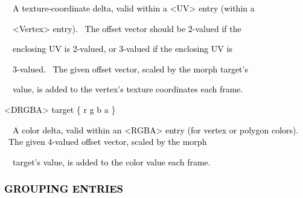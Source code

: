 \documentclass[a4paper]{article}
\newcommand\textstyleOOoComputerKeyWord[1]{\textrm{\textcolor[rgb]{0.0,0.0,0.5019608}{#1}}}
\newcommand\textstyleOOoAssemblerSpecialChar[1]{\textrm{\textcolor[rgb]{0.0,0.5019608,0.0}{#1}}}
\newcommand\textstyleOOoAssemblerIdent[1]{\textrm{\textcolor{black}{#1}}}
\begin{document}
\bigskip

{\color{black}
\textstyleOOoComputerKeyWord{\textcolor{black}{\ \ A texture-coordinate delta, valid within a
{\textless}UV{\textgreater} entry (within a}}}

{\color{black}
\textstyleOOoComputerKeyWord{\textcolor{black}{\ \ {\textless}Vertex{\textgreater} entry). \ The offset vector should be
2-valued if the}}}

{\color{black}
\textstyleOOoComputerKeyWord{\textcolor{black}{\ \ enclosing UV is 2-valued, or 3-valued if the enclosing UV is}}}

{\color{black}
\textstyleOOoComputerKeyWord{\textcolor{black}{\ \ 3-valued. \ The given offset vector, scaled by the morph target's}}}

{\color{black}
\textstyleOOoComputerKeyWord{\textcolor{black}{\ \ value, is added to the vertex's texture coordinates each frame.}}}


\bigskip

{\color{black}
\textstyleOOoAssemblerSpecialChar{{\textless}}\textstyleOOoAssemblerIdent{DRGBA}\textstyleOOoAssemblerSpecialChar{{\textgreater}}\textstyleOOoComputerKeyWord{\textcolor{black}{
}}\textstyleOOoAssemblerIdent{target}\textstyleOOoComputerKeyWord{\textcolor{black}{
}}\textstyleOOoAssemblerSpecialChar{\{}\textstyleOOoComputerKeyWord{\textcolor{black}{
}}\textstyleOOoAssemblerIdent{r}\textstyleOOoComputerKeyWord{\textcolor{black}{
}}\textstyleOOoAssemblerIdent{g}\textstyleOOoComputerKeyWord{\textcolor{black}{
}}\textstyleOOoAssemblerIdent{b}\textstyleOOoComputerKeyWord{\textcolor{black}{
}}\textstyleOOoAssemblerIdent{a}\textstyleOOoComputerKeyWord{\textcolor{black}{
}}\textstyleOOoAssemblerSpecialChar{\}}}


\bigskip

{\color{black}
\textstyleOOoComputerKeyWord{\textcolor{black}{\ \ A color delta, valid within an {\textless}RGBA{\textgreater} entry
(for vertex or polygon colors). \ The given 4-valued offset vector, scaled by the morph}}}

{\color{black}
\textstyleOOoComputerKeyWord{\textcolor{black}{\ \ target's value, is added to the color value each frame.}}}

\subsubsection[GROUPING ENTRIES]{\textstyleOOoComputerKeyWord{\textcolor{black}{GROUPING ENTRIES}}}
\hypertarget{RefHeading7684869075401}{}
\bigskip
\end{document}

